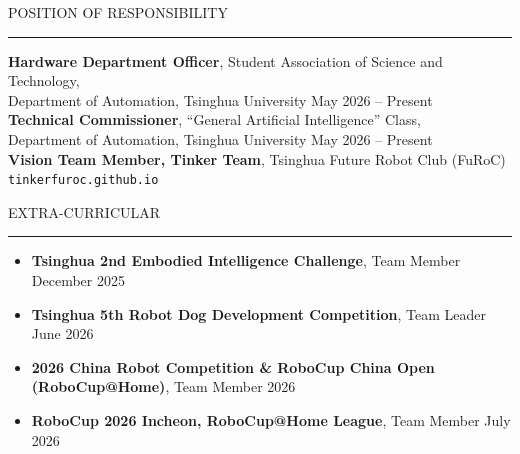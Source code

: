 \documentclass{resume} %
\renewenvironment{rSection}[1]{
\sectionskip
\textcolor{TsinghuaPurple}{\MakeUppercase{#1}}
\sectionlineskip
\hrule
\begin{list}{}{
\setlength{\leftmargin}{0em}
}
\item[]
}{
\end{list}
}
\begin{document}
 
  
\begin{rSection}{POSITION OF RESPONSIBILITY} \itemsep -3pt

{\textbf{Hardware Department Officer}, Student Association of Science and Technology, \\Department of Automation, Tsinghua University} \hfill May 2026 -- Present \\
{\textbf{Technical Commissioner}, ``General Artificial Intelligence'' Class, \\Department of Automation, Tsinghua University} \hfill May 2026 -- Present \\
{\textbf{Vision Team Member, Tinker Team}, Tsinghua Future Robot Club (FuRoC)} \hfill \texttt{tinkerfuroc.github.io} \\

\end{rSection}
  


\begin{rSection}{Extra-Curricular} \itemsep -2pt

\begin{itemize}

\item \textbf{Tsinghua 2nd Embodied Intelligence Challenge}, Team Member \hfill December 2025
\item \textbf{Tsinghua 5th Robot Dog Development Competition}, Team Leader \hfill June 2026
\item \textbf{2026 China Robot Competition \& RoboCup China Open (RoboCup@Home)}, Team Member \hfill 2026
\item \textbf{RoboCup 2026 Incheon, RoboCup@Home League}, Team Member \hfill July 2026

\end{itemize}

\end{rSection} 


\end{document}
